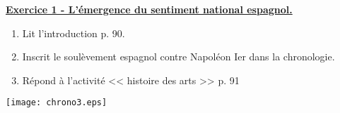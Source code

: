 \documentclass[12pt]{article}
\begin{document}
\vfill
\underline{\textbf{Exercice 1 - L'émergence du sentiment national espagnol.}}\\

\begin{minipage}{5cm}
\begin{enumerate}
 \item Lit l'introduction p. 90.
 \item Inscrit le soulèvement espagnol contre Napoléon Ier dans la chronologie.
 \item Répond à l'activité << histoire des arts >> p. 91
 \end{enumerate}
\end{minipage}
\begin{minipage}{10cm}
\texttt{[image: chrono3.eps]}
\end{minipage}
\end{document}

